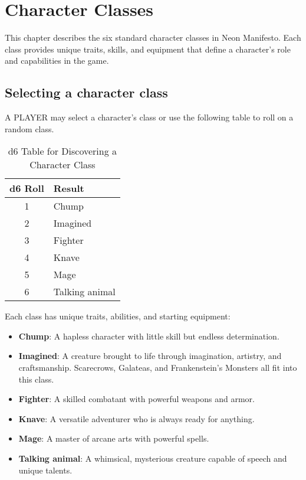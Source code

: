 \section{Character Classes}
This chapter describes the six standard character classes in Neon Manifesto. Each class provides unique traits, skills, and equipment that define a character's role and capabilities in the game.

\subsection{Selecting a character class}
A PLAYER may select a character's class or use the following table to roll on a random class.
\begin{table}[h!]
\centering
\begin{tabular}{|c|l|}
\hline
\textbf{d6 Roll} & \textbf{Result} \\
\hline
1 & Chump \\
2 & Imagined \\
3 & Fighter \\
4 & Knave \\
5 & Mage \\
6 & Talking animal \\
\hline
\end{tabular}
\caption{d6 Table for Discovering a Character Class}
\label{tab:d6_character_table}
\end{table}

Each class has unique traits, abilities, and starting equipment:
\begin{itemize}
\item \textbf{Chump}: A hapless character with little skill but endless determination.
\item \textbf{Imagined}: A creature brought to life through imagination, artistry, and craftsmanship. Scarecrows, Galateas, and Frankenstein's Monsters all fit into this class.
\item \textbf{Fighter}: A skilled combatant with powerful weapons and armor.
\item \textbf{Knave}: A versatile adventurer who is always ready for anything.
\item \textbf{Mage}: A master of arcane arts with powerful spells.
\item \textbf{Talking animal}: A whimsical, mysterious creature capable of speech and unique talents.
\end{itemize}







